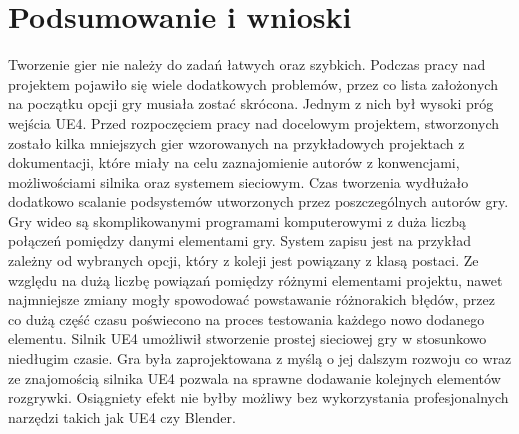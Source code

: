 \documentclass[multip]{SGGW-thesis}
\begin{document}
\chapter{Podsumowanie i wnioski}
Tworzenie gier nie należy do zadań łatwych oraz szybkich. Podczas pracy nad projektem pojawiło się wiele dodatkowych problemów, przez co lista założonych na początku opcji gry musiała zostać skrócona. Jednym z nich był wysoki próg wejścia UE4. Przed rozpoczęciem pracy nad docelowym projektem, stworzonych zostało kilka mniejszych gier wzorowanych na przykładowych projektach z dokumentacji\cite{docs-tutorials}, które miały na celu zaznajomienie autorów z konwencjami, możliwościami silnika oraz systemem sieciowym. Czas tworzenia wydłużało dodatkowo scalanie podsystemów utworzonych przez poszczególnych autorów gry. Gry wideo są skomplikowanymi programami komputerowymi z duża liczbą połączeń pomiędzy danymi elementami gry. System zapisu jest na przykład zależny od wybranych opcji, który z koleji jest powiązany z klasą postaci. Ze względu na dużą liczbę powiązań pomiędzy różnymi elementami projektu, nawet najmniejsze zmiany mogły spowodować powstawanie różnorakich błędów, przez co dużą część czasu poświecono na proces testowania każdego nowo dodanego elementu.
\newline \indent Silnik UE4 umożliwił stworzenie prostej sieciowej gry w stosunkowo niedługim czasie. Gra była zaprojektowana z myślą o jej dalszym rozwoju co wraz ze znajomością silnika UE4 pozwala na  sprawne dodawanie kolejnych elementów rozgrywki. Osiągniety efekt nie byłby możliwy bez wykorzystania profesjonalnych narzędzi takich jak UE4 czy Blender.
\end{document}
